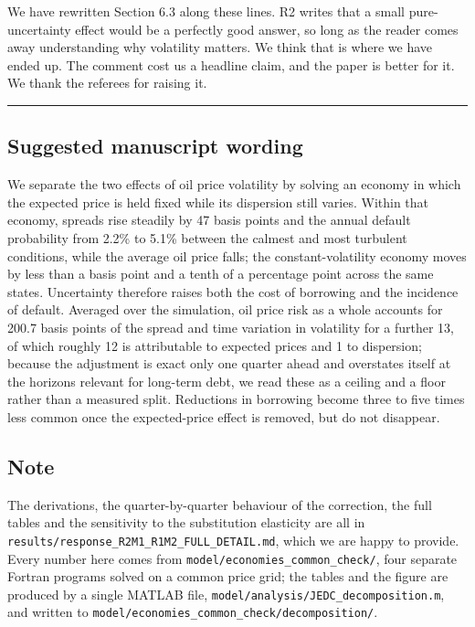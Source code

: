 \documentclass[11pt]{article}
\begin{document}
We have rewritten Section 6.3 along these lines. R2 writes that a small
pure-uncertainty effect would be a perfectly good answer, so long as the reader
comes away understanding why volatility matters. We think that is where we have
ended up. The comment cost us a headline claim, and the paper is better for it. We thank
the referees for raising it.

\bigskip
\hrule
\bigskip

\subsection*{Suggested manuscript wording}

\begin{shaded}
\noindent
We separate the two effects of oil price volatility by solving an economy in
which the expected price is held fixed while its dispersion still varies. Within
that economy, spreads rise steadily by 47 basis points and the annual default
probability from 2.2\% to 5.1\% between the calmest and most turbulent
conditions, while the average oil price falls; the constant-volatility economy
moves by less than a basis point and a tenth of a percentage point across the
same states. Uncertainty therefore raises both the cost of borrowing and the
incidence of default. Averaged over the simulation, oil price risk as a whole
accounts for 200.7 basis points of the spread and time variation in volatility
for a further 13, of which roughly 12 is attributable to expected prices and 1
to dispersion; because the adjustment is exact only one quarter ahead and
overstates itself at the horizons relevant for long-term debt, we read these as
a ceiling and a floor rather than a measured split. Reductions in borrowing
become three to five times less common once the expected-price effect is
removed, but do not disappear.
\end{shaded}

\subsection*{Note}

The derivations, the quarter-by-quarter behaviour of the correction, the full
tables and the sensitivity to the substitution elasticity are all in
\texttt{results/response\_R2M1\_R1M2\_FULL\_DETAIL.md}, which we are happy to
provide. Every number here comes from
\texttt{model/economies\_common\_check/}, four separate Fortran programs solved
on a common price grid; the tables and the figure are produced by a single
MATLAB file, \texttt{model/analysis/JEDC\_decomposition.m}, and written to
\texttt{model/economies\_common\_check/decomposition/}.

\end{document}
